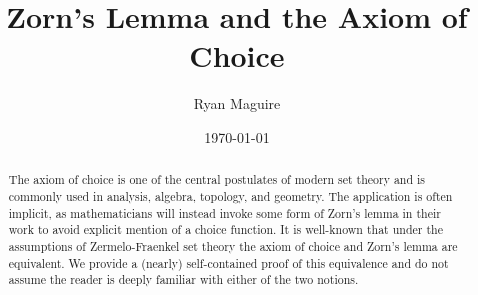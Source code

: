 \documentclass{article}
\title{Zorn's Lemma and the Axiom of Choice}
\author{Ryan Maguire}
\date{\today}
\begin{document}
    \maketitle
    \begin{abstract}
        The axiom of choice is one of the central postulates of modern
        set theory and is commonly used in analysis, algebra, topology,
        and geometry. The application is often implicit, as mathematicians
        will instead invoke some form of Zorn's lemma in their work to avoid
        explicit mention of a choice function. It is well-known that under the
        assumptions of Zermelo-Fraenkel set theory the axiom of choice and
        Zorn's lemma are equivalent. We provide a (nearly) self-contained proof
        of this equivalence and do not assume the reader is deeply familiar
        with either of the two notions.
    \end{abstract}
    \tableofcontents
\end{document}

